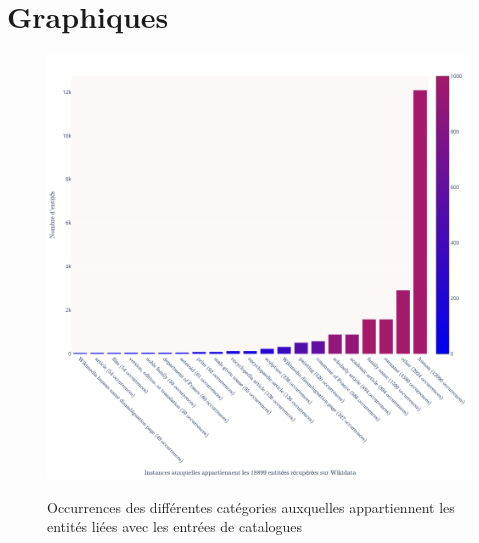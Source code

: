 \chapter{Graphiques}
\begin{figure}
	\centering
	\includegraphics[width=\linewidth]{annexes/fig_wikidata_instances.png}
	\caption \\Occurrences des différentes catégories auxquelles appartiennent les entités \wkd{} liées avec les entrées de catalogues
	\label{appendix:wikidata_instances}
\end{figure}

